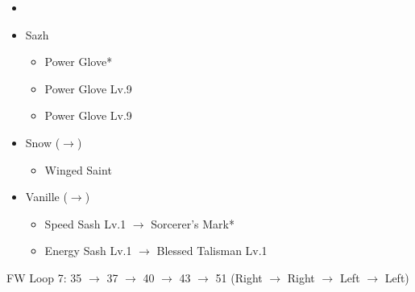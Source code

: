 \begin{menu}
	\begin{itemize}
	\paradigm
		\begin{itemize}
			\item {}%
				{\paradigmline{\com}{(\sen)}{\com}}%
				{\paradigmline[4]{\com}{(\com)}{(\sab)}}%
				{\paradigmline{(\rav)}{\sen}{\rav}}%
				{\paradigmline{\rav}{(\rav)}{\rav}}%
				{\paradigmline{\syn}{\sen}{(\sab)}}%
				{\paradigmline{(\sab)}{\sen}{(\rav)}}%
		\end{itemize}
	\equip
		\begin{itemize}
			\item Sazh
				\begin{itemize}
					\item Power Glove*
					\item Power Glove Lv.9			
					\item Power Glove Lv.9
				\end{itemize}
			\item Snow ($\rightarrow$)
				\begin{itemize}
					\item Winged Saint
				\end{itemize}
			\item Vanille ($\rightarrow$)
				\begin{itemize}
					\item Speed Sash Lv.1 $\rightarrow$ Sorcerer's Mark* 
					\item Energy Sash Lv.1 $\rightarrow$ Blessed Talisman Lv.1
				\end{itemize}
		\end{itemize}
	\end{itemize}
\end{menu}

\renewcommand{\first}{[1] Offensive Screen (\com/\sen/\com)}
\renewcommand{\second}{[2] Devastation (\com/\com/\sab)}
\renewcommand{\third}{[3] Mystic Tower (\rav/\sen/\rav)}
\renewcommand{\fourth}{[4] Tri-Disaster (\rav/\rav/\rav)}
\renewcommand{\fifth}{[5] Premeditation (\syn/\sen/\sab)}
\renewcommand{\sixth}{[6] Matador (\sab/\sen/\rav)}

FW Loop 7: 35 $\rightarrow$ 37 $\rightarrow$ 40 $\rightarrow$ 43 $\rightarrow$ 51 (Right $\rightarrow$ Right $\rightarrow$ Left $\rightarrow$ Left)

